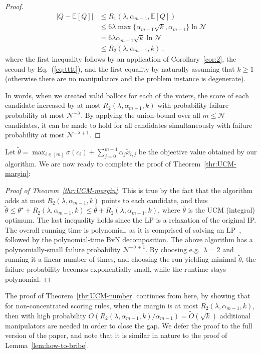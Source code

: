 \documentclass[letterpaper]{article} %
\newtheorem{corollary}[theorem]{Corollary}
\theoremstyle{definition}
\newcommand{\NN}{\mathcal{N}}
\newcommand{\EE}{\mathbb{E}}
\begin{document}
\begin{proof}
	\begin{align*}
\left\lvert Q - \EE[Q]\right\rvert &\leq R_1(\lambda,\alpha_{m-1},\EE[Q])\\
&\leq 6\lambda \max\{\alpha_{m-1}\sqrt{k}, \alpha_{m-1}\}\ln \NN\\
&= 6\lambda \alpha_{m-1} \sqrt{k} \ln \NN\\
&\leq R_2(\lambda, \alpha_{m-1},k)\ .
\end{align*}
where the first inequality follows by an application of Corollary~\ref{cor:2}, the second by Eq.~(\ref{eq:tttt}), and the first equality by naturally assuming that $k \geq 1$ (otherwise there are no manipulators and the problem instance is degenerate).


In words, when we created valid ballots for each of the voters, the score of each candidate increased by at most $R_2(\lambda, \alpha_{m-1},k)$ with probability failure probability at most $\NN^{-\lambda}$.  By applying the union-bound over all $m\leq \NN$ candidates, it can be made to hold for all candidates simultaneously  with failure probability at most $\NN^{-\lambda+1}$.
\end{proof}
Let $\tilde{\theta}=\max_{i\in[m]}\sigma(c_i)+\sum_{j=0}^{m-1} \alpha_j \tilde{x}_{i,j}$ be the objective value obtained by our algorithm. We are now ready to complete the proof of Theorem~\ref{thr:UCM-margin}:
\begin{proof}[Proof of Theorem~\ref{thr:UCM-margin}]
	This is true by the fact that the algorithm adds  at most $R_2(\lambda, \alpha_{m-1},k)$ points to each candidate, and thus $\tilde{\theta} \leq \theta^\star + R_2(\lambda, \alpha_{m-1},k) \leq \bar{\theta} + R_2(\lambda, \alpha_{m-1},k)$, where $\bar{\theta}$ is the UCM (integral) optimum. The last inequality holds since the LP is a relaxation of the original IP. The overall running time is polynomial, as it is comprised of solving an LP~\cite{DBLP:journals/combinatorica/Karmarkar84}, followed by the polynomial-time BvN decomposition.
	The above algorithm has a polynomially-small failure probability $\NN^{-\lambda+1}$. By choosing e.g.\ $\lambda=2$ and running it a linear number of times, and choosing the run yielding minimal $\tilde{\theta}$, the failure probability becomes exponentially-small, while the runtime stays polynomial.
\end{proof}
The proof of Theorem~\ref{thr:UCM-number} continues from here, by showing that for non-concentrated scoring rules, when the margin
is at most $R_2(\lambda, \alpha_{m-1},k)$, then with high probability $O(R_2(\lambda, \alpha_{m-1},k) / \alpha_{m-1}) = \widetilde{O}(\sqrt{k})$ additional manipulators are needed in order to close the gap. We defer the proof to the full version of the paper, and note that it is similar in nature to the proof of Lemma~\ref{lem:how-to-bribe}.
\end{document}

